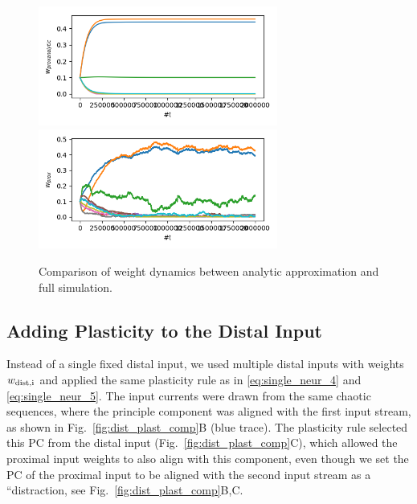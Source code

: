 \documentclass[10pt,a4paper]{article}
\begin{document}
\begin{figure}
\centering
\includegraphics[width=0.7\textwidth]{./figures/weights_analytic_comp.png}
\includegraphics[width=0.7\textwidth]{./figures/weights_full_sim_comp.png}
\caption{Comparison of weight dynamics between analytic approximation and full simulation.}
\label{fig:weight_dyn_analytic_comp}
\end{figure}

\subsection{Adding Plasticity to the Distal Input}

Instead of a single fixed distal input, we used multiple distal inputs with weights $w_{\rm dist, i}$ and applied the same plasticity rule as in \eqref{eq:single_neur_4} and \eqref{eq:single_neur_5}. The input currents were drawn from the same chaotic sequences, where the principle component was aligned with the first input stream, as shown in Fig.~\ref{fig:dist_plast_comp}B (blue trace). The plasticity rule selected this PC from the distal input (Fig.~\ref{fig:dist_plast_comp}C), which allowed the proximal input weights to also align with this component, even though we set the PC of the proximal input to be aligned with the second input stream as a ``distraction, see Fig.~\ref{fig:dist_plast_comp}B,C.
\end{document}
